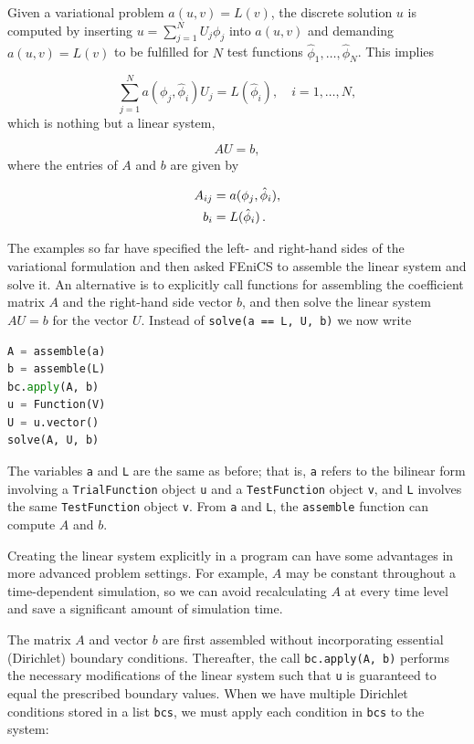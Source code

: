 \documentclass[graybox,envcountchap,sectrefs,final]{svmonodo}
\begin{document}
Given a variational problem $a(u,v)=L(v)$, the discrete solution $u$
is computed by inserting $u=\sum_{j=1}^N U_j \phi_j$ into $a(u,v)$ and
demanding $a(u,v)=L(v)$ to be fulfilled for $N$ test functions
$\hat\phi_1,\ldots,\hat\phi_N$. This implies

\begin{equation*}
\sum_{j=1}^N a(\phi_j,\hat\phi_i) U_j = L(\hat\phi_i),\quad i=1,\ldots,N,
\end{equation*}
which is nothing but a linear system,

\begin{equation*}
  AU = b,
\end{equation*}
where the entries of $A$ and $b$ are given by

\begin{align*}
  A_{ij} &= a(\phi_j, \hat{\phi}_i), \\
  b_i &= L(\hat\phi_i)\tp
\end{align*}


The examples so far have specified the left- and right-hand sides of
the variational formulation and then asked FEniCS to assemble the
linear system and solve it. An alternative is to explicitly call
functions for assembling the coefficient matrix $A$ and the right-hand
side vector $b$, and then solve the linear system $AU=b$ for
the vector $U$. Instead of \texttt{solve(a == L, U, b)} we now write

\begin{lstlisting}[language=Python,style=graycolor]
A = assemble(a)
b = assemble(L)
bc.apply(A, b)
u = Function(V)
U = u.vector()
solve(A, U, b)
\end{lstlisting}
The variables \texttt{a} and \texttt{L} are the same as before; that is, \texttt{a} refers
to the bilinear form involving a \texttt{TrialFunction} object \texttt{u}
and a \texttt{TestFunction} object \texttt{v}, and \texttt{L} involves the same \texttt{TestFunction}
object \texttt{v}. From \texttt{a} and \texttt{L}, the \texttt{assemble} function can compute
$A$ and $b$.

Creating the linear system explicitly in a program can have some
advantages in more advanced problem settings. For example, $A$ may
be constant throughout a time-dependent simulation, so we can avoid
recalculating $A$ at every time level and save a significant amount
of simulation time.

The matrix $A$ and vector $b$ are first assembled without
incorporating essential (Dirichlet) boundary conditions. Thereafter,
the call \texttt{bc.apply(A, b)} performs the necessary modifications of the
linear system such that \texttt{u} is guaranteed to equal the prescribed
boundary values. When we have multiple Dirichlet conditions stored in
a list \texttt{bcs}, we must apply each condition in \texttt{bcs} to the system:
\end{document}
